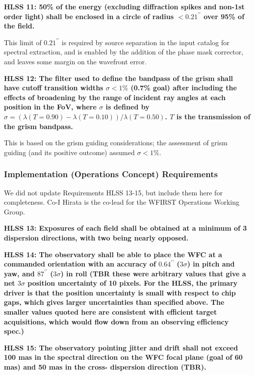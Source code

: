  \noindent
 {\bf HLSS 11: 50\% of the energy (excluding diffraction spikes and non-1st order
 light) shall be enclosed in a circle of radius $<0.21^{\prime\prime}$ over 95\% of the field.}

 This limit of $0.21^{\prime\prime}$ is required by source separation in the input
 catalog for spectral extraction, and is enabled by the addition of the phase
 mask corrector, and leaves some margin on the wavefront error.

 \noindent
 {\bf HLSS 12: The filter used to define the bandpass of the grism shall have cutoff
 transition widths $\sigma < 1\%$ (0.7\% goal) after including the effects of broadening
 by the range of incident ray angles at each position in the FoV, where $\sigma$ is
 defined by $\sigma= (\lambda(T=0.90)- \lambda(T=0.10))/\lambda(T=0.50)$. $T$ is the transmission of the
 grism bandpass.}

 This is based on the grism guiding considerations; the assessment of grism
 guiding (and its positive outcome) assumed $\sigma < 1\%$.

 \subsubsection{Implementation (Operations Concept) Requirements}


 We did not update Requirements HLSS 13-15, but include them here for
 completeness. Co-I Hirata is the co-lead for the WFIRST Operations Working Group.

 \noindent
 {\bf HLSS 13: Exposures of each field shall be obtained at a minimum of 3 dispersion
 directions, with two being nearly opposed.}

 \noindent
 {\bf HLSS 14: The observatory shall be able to place the WFC at a commanded
 orientation with an accuracy of $0.64^{\prime\prime}$ ($3\sigma$) in pitch and yaw, and $87^{\prime\prime}$ ($3\sigma$) in
 roll (TBR these were arbitrary values that give a net $3\sigma$ position uncertainty
 of 10 pixels. For the HLSS, the primary driver is that the position uncertainty
 is small with respect to chip gaps, which gives larger uncertainties than
 specified above. The smaller values quoted here are consistent with efficient
 target acquisitions, which would flow down from an observing efficiency spec.)}

 \noindent
 {\bf HLSS 15: The observatory pointing jitter and drift shall not exceed 100 mas in
 the spectral direction on the WFC focal plane (goal of 60 mas) and 50 mas in the
 cross- dispersion direction (TBR).}

